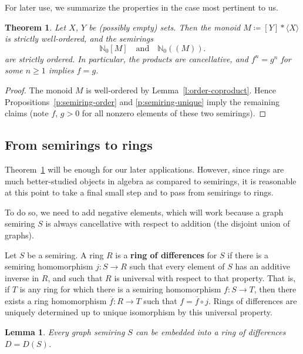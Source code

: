 \documentclass{amsart}
\theoremstyle{plain}
\newtheorem{theorem}[thm]{Theorem}
\newtheorem{lemma}[thm]{Lemma}
\theoremstyle{definition}
\newcommand{\defit}[1]{\textbf{#1}}
\newcommand{\bN}{\mathbb N}
\newcommand{\hmnser}[2]{{#1}(\!({#2})\!)}
\begin{document}
For later use, we summarize the properties in the case most pertinent to us.

\begin{theorem} \label{t:free-semigroup-rings}
  Let $X$, $Y$ be \textup(possibly empty\textup) sets.
  Then the monoid $M\coloneqq [Y] * \langle X \rangle$ is strictly well-ordered, and the semirings
  \[
  \bN_0[M] \quad\text{and}\quad \hmnser{\bN_0}{M}.
  \]
  are strictly ordered.
  In particular, the products are cancellative, and $f^n =g^n$ for some $n \ge 1$ implies $f=g$.
\end{theorem}

\begin{proof}
  The monoid $M$ is well-ordered by Lemma~\ref{l:order-coproduct}.
  Hence Propositions~\ref{p:semiring-order} and \ref{p:semiring-unique} imply the remaining claims (note $f$, $g > 0$ for all nonzero elements of these two semirings).
\end{proof}

\subsection{From semirings to rings}

Theorem~\ref{t:free-semigroup-rings} will be enough for our later applications.
However, since rings are much better-studied objects in algebra as compared to semirings, it is reasonable at this point to take a final small step and to pass from semirings to rings.

To do so, we need to add negative elements, which will work because a graph semiring $S$ is always cancellative with respect to addition (the disjoint union of graphs).

Let $S$ be a semiring.
A ring $R$ is a \defit{ring of differences} for $S$ if there is a semiring homomorphism $j\colon S \to R$ such that every element of $S$ has an additive inverse in $R$, and such that $R$ is universal with respect to that property.
That is, if $T$ is any ring for which there is a semiring homomorphism $f\colon S \to T$, then there exists a ring homomorphism $\overline{f}\colon R \to T$ such that $f=\overline f \circ j$.
Rings of differences are uniquely determined up to unique isomorphism by this universal property.

\begin{lemma}
  Every graph semiring $S$ can be embedded into a ring of differences $D=D(S)$.
\end{lemma}
\end{document}
